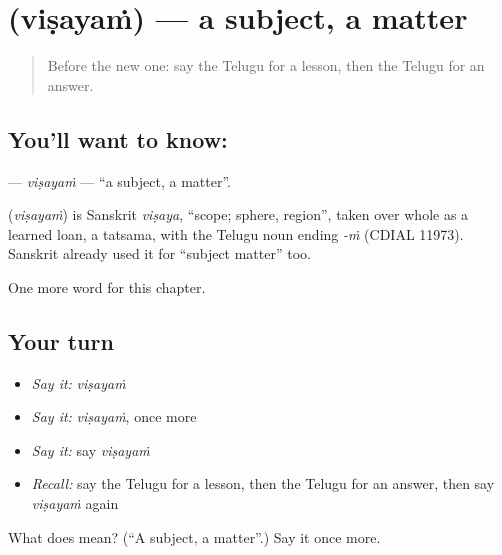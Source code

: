 \section[\texorpdfstring{\te{విషయం} (viṣayaṁ)}{విషయం (viṣayaṁ)}]{ (viṣayaṁ) — a subject, a matter}

\label{lesson:TE-C274-visayam}



\begin{quote}
Before the new one: say the Telugu for a lesson, then the Telugu for an answer.
\end{quote}

\subsection*{You'll want to know: }
\textbf{} — \emph{viṣayaṁ} — \textquotedblleft{}a subject, a matter\textquotedblright{}.

\begin{cousinweb}
\textbf{} (\emph{viṣayaṁ}) is Sanskrit \emph{viṣaya}, \textquotedblleft{}scope; sphere, region\textquotedblright{}, taken over whole as a learned loan, a tatsama, with the Telugu noun ending \emph{-ṁ} (CDIAL 11973). Sanskrit already used it for \textquotedblleft{}subject matter\textquotedblright{} too.
\end{cousinweb}

\begin{grammarlens}[title={What you've built}]
One more word for this chapter.
\end{grammarlens}

\subsection*{Your turn}
\begin{itemize}
\raggedright
  \item \emph{Say it:} \emph{viṣayaṁ}
  \item \emph{Say it:} \emph{viṣayaṁ}, once more
  \item \emph{Say it:} say \emph{viṣayaṁ}
  \item \emph{Recall:} say the Telugu for a lesson, then the Telugu for an answer, then say \emph{viṣayaṁ} again
\end{itemize}

\begin{tcolorbox}[breakable,colback=teal!4,colframe=teal!35!black,title={Before you move on}]
What does  mean? (\textquotedblleft{}A subject, a matter\textquotedblright{}.) Say it once more.
\end{tcolorbox}
